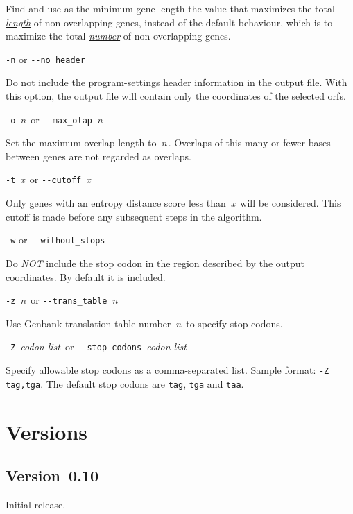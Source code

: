 \documentclass[fleqn,titlepage,11pt]{article}
\def\Desc#1{\,\mbox{\emph{#1}}\,}
\def\Pg#1{\texttt{#1}}
\begin{document}
  Find and use as the minimum gene length the value that maximizes the
  total \underline{\emph{length}} of non-overlapping genes, instead of
  the default behaviour, which is to maximize the total \underline{\emph{number}}
  of non-overlapping genes.

\exdent
  \verb`-n` \enskip or \enskip \verb`--no_header`

  Do not include the program-settings header information in the
  output file.  With this option, the output file will contain
  only the coordinates of the selected orfs.

\exdent
  \verb`-o` \Desc{n} \enskip or \enskip \verb`--max_olap` \Desc{n}

  Set the maximum overlap length to \Desc{n}.  Overlaps of this
  many or fewer bases between genes are not regarded as overlaps.

\exdent
  \verb`-t` \Desc{x} \enskip or \enskip \verb`--cutoff` \Desc{x}

  Only genes with an entropy distance score less than \Desc{x} will
  be considered.  This cutoff is made before any subsequent steps
  in the algorithm.

\exdent
  \verb`-w` \enskip or \enskip \verb`--without_stops`

  Do \underline{\emph{NOT}} include the stop codon in the region
  described by the output coordinates.  By default it is included.

\exdent
  \verb`-z` \Desc{n} \enskip or \enskip \verb`--trans_table` \Desc{n}

  Use Genbank translation table number \Desc{n} to specify stop codons.

\exdent
  \verb`-Z` \Desc{codon-list} \enskip or \enskip \verb`--stop_codons` \Desc{codon-list}

  Specify allowable stop codons as a comma-separated list.
  Sample format:  \verb`-Z tag,tga`.
  The default stop codons are \Pg{tag}, \Pg{tga} and \Pg{taa}.
\el

\section{Versions}

\subsection{Version~0.10}
  \bi\RaggedRight
  \item    
    Initial release.
  \ei

\raggedright


\end{document}
